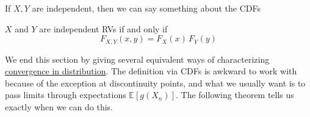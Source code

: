   If $X, Y$ are independent, then we can say something about the CDFs 

  \begin{theorem}
    \label{thm:independence-via-the-joint-cdf}
    $X$ and $Y$ are independent RVs if and only if 
    \begin{equation}
      F_{X, Y} (x, y) = F_X (x) \, F_Y (y)
    \end{equation}
  \end{theorem}

  We end this section by giving several equivalent ways of characterizing \hyperref[def:convergence-in-distribution]{convergence in distribution}. The definition via CDFs is awkward to work with because of the exception at discontinuity points, and what we usually want is to pass limits through expectations $\mathbb{E}[g(X_n)]$. The following theorem tells us exactly when we can do this.


